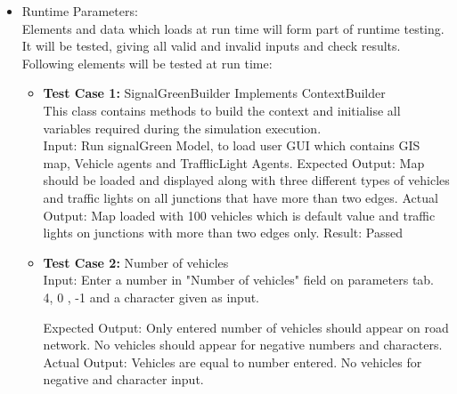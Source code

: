 \documentclass[11pt, oneside]{article}   	%
\begin{document}
\begin{itemize}
\begin{enumerate}
 \end{enumerate}
\item Runtime Parameters: \hfill \\
Elements and data which loads at run time will form part of runtime testing. It will be tested, giving all valid and invalid inputs and check results. Following elements will be tested at run time:
\begin{itemize}
\item \textbf{Test Case 1:} SignalGreenBuilder Implements ContextBuilder\hfill \\
This class contains methods to build the context and initialise all variables required during the simulation execution.\hfil \\
Input: Run signalGreen Model, to load user GUI which contains GIS map, Vehicle agents and TrafflicLight Agents.
Expected Output: Map should be loaded and displayed along with three different types of vehicles and traffic lights on all junctions that have more than two edges.
Actual Output: Map loaded with 100 vehicles which is default value and traffic lights on junctions with more than two edges only.
Result: Passed
\item\textbf{Test Case 2:} Number of vehicles\hfill \\
Input: Enter a number in "Number of vehicles" field on parameters tab.\hfill \\
4, 0 , -1 and a character given as input.

Expected Output: Only entered number of vehicles should appear on road network. No vehicles should appear for negative numbers and characters. \hfill \\
Actual Output:  Vehicles are equal to number entered. No vehicles for negative and character input.\hfil \\


\end{itemize}
\end{itemize}
\end{document}
